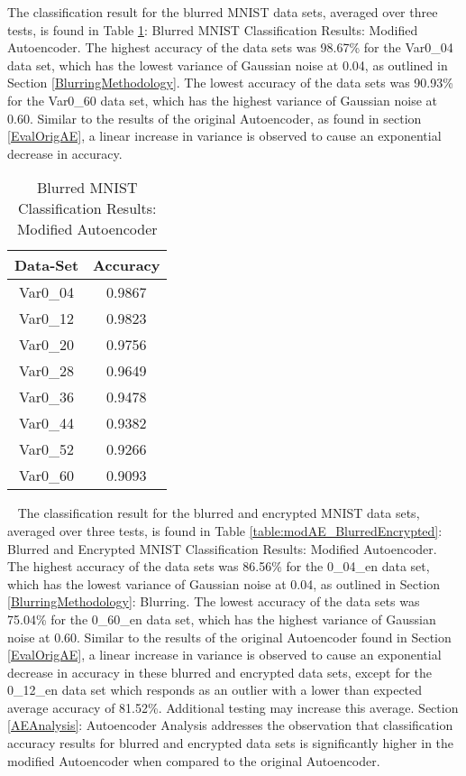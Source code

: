 \documentclass[12pt, titlepage]{article}
\begin{document}
\noindent The classification result for the blurred MNIST data sets, averaged over three tests, is found in Table \ref{table:modAE_Blurred}: Blurred MNIST Classification Results: Modified Autoencoder. The highest accuracy of the data sets was 98.67\% for the Var0\_04 data set, which has the lowest variance of Gaussian noise at 0.04, as outlined in Section \ref{BlurringMethodology}. The lowest accuracy of the data sets was 90.93\% for the Var0\_60 data set, which has the highest variance of Gaussian noise at 0.60. Similar to the results of the original Autoencoder, as found in section \ref{EvalOrigAE}, a linear increase in variance is observed to cause an exponential decrease in accuracy.

\begin{table}[!h]
	\begin{center}
		\begin{tabular}{| c | c |}
			\hline
			\textbf{Data-Set} & \textbf{Accuracy}\\
			\hline
			Var0\_04 & 0.9867\\
			\hline
			Var0\_12 & 0.9823\\
			\hline
			Var0\_20 & 0.9756\\
			\hline
			Var0\_28 & 0.9649\\
			\hline
			Var0\_36 & 0.9478\\
			\hline
			Var0\_44 & 0.9382\\
			\hline
			Var0\_52 & 0.9266\\
			\hline
			Var0\_60 & 0.9093\\
			\hline
		\end{tabular}
		\caption{Blurred MNIST Classification Results: Modified Autoencoder}
		\label{table:modAE_Blurred}
	\end{center}
\end{table}

~\newpage
\noindent The classification result for the blurred and encrypted MNIST data sets, averaged over three tests, is found in Table \ref{table:modAE_BlurredEncrypted}: Blurred and Encrypted MNIST Classification Results: Modified Autoencoder. The highest accuracy of the data sets was 86.56\% for the 0\_04\_en data set, which has the lowest variance of Gaussian noise at 0.04, as outlined in Section \ref{BlurringMethodology}: Blurring. The lowest accuracy of the data sets was 75.04\% for the 0\_60\_en data set, which has the highest variance of Gaussian noise at 0.60. Similar to the results of the original Autoencoder found in Section \ref{EvalOrigAE}, a linear increase in variance is observed to cause an exponential decrease in accuracy in these blurred and encrypted data sets, except for the 0\_12\_en data set which responds as an outlier with a lower than expected average accuracy of 81.52\%. Additional testing may increase this average. Section \ref{AEAnalysis}: Autoencoder Analysis addresses the observation that classification accuracy results for blurred and encrypted data sets is significantly higher in the modified Autoencoder when compared to the original Autoencoder.\\ 
\end{document}
